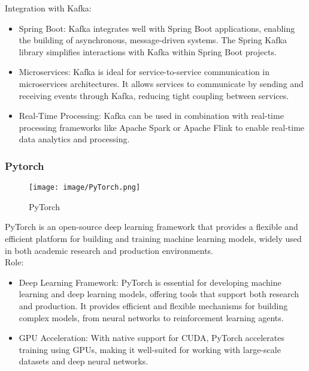 \documentclass[conference]{IEEEtran}
\begin{document}
Integration with Kafka:
\begin{itemize}
    \item Spring Boot: Kafka integrates well with Spring Boot applications, enabling the building of asynchronous, message-driven systems. The Spring Kafka library simplifies interactions with Kafka within Spring Boot projects.\\
    \item Microservices: Kafka is ideal for service-to-service communication in microservices architectures. It allows services to communicate by sending and receiving events through Kafka, reducing tight coupling between services.\\
    \item Real-Time Processing: Kafka can be used in combination with real-time processing frameworks like Apache Spark or Apache Flink to enable real-time data analytics and processing.\\
\end{itemize}



\subsubsection{Pytorch}

\begin{figure}[h!]
    \centering
    \texttt{[image: image/PyTorch.png]}
    \caption{PyTorch}
    \label{fig:enter-label}
\end{figure}

\noindent PyTorch is an open-source deep learning framework that provides a flexible and efficient platform for building and training machine learning models, widely used in both academic research and production environments.\\

Role:
\begin{itemize}
    \item Deep Learning Framework: PyTorch is essential for developing machine learning and deep learning models, offering tools that support both research and production. It provides efficient and flexible mechanisms for building complex models, from neural networks to reinforcement learning agents.\\
    \item GPU Acceleration: With native support for CUDA, PyTorch accelerates training using GPUs, making it well-suited for working with large-scale datasets and deep neural networks.\\
\end{itemize}
\end{document}
